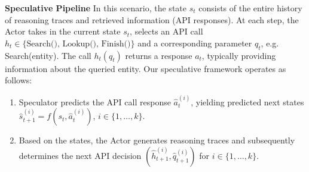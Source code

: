 \textbf{Speculative Pipeline} In this scenario, the state $s_t$ consists of the entire history of reasoning traces and retrieved information (API responses). At each step, the Actor takes in the current state $s_t$,  selects an API call $h_t \in\{\text{Search(), Lookup(), Finish()}\}$ and a corresponding parameter $q_t$, e.g. Search(entity). The call $h_t(q_t)$ returns a response $a_t$, typically providing information about the queried entity. Our speculative framework operates as follows:
\begin{enumerate}[leftmargin=*]
    \item Speculator predicts the API call response $\hat{a}_t^{(i)}$, yielding predicted next states $\hat{s}_{t+1}^{(i)} = f(s_t,\hat{a}_t^{(i)})$, $i\in\{1,\dots,k\}$.
    \item Based on the states, the Actor generates reasoning traces and subsequently determines the next API decision $(\hat{h}_{t+1}^{(i)}, \hat{q}_{t+1}^{(i)})$ for $i\in\{1,\dots,k\}$.
\end{enumerate}









